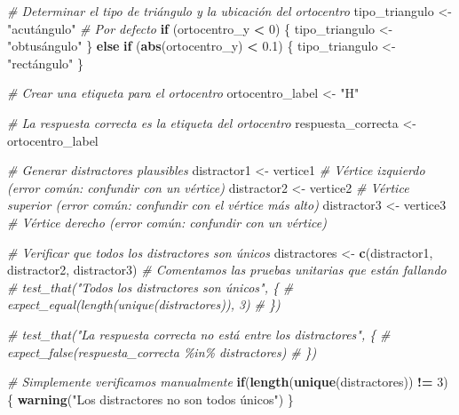 \documentclass[
]{article}
\newenvironment{Shaded}{\begin{snugshade}}{\end{snugshade}}
\newcommand{\CommentTok}[1]{\textcolor[rgb]{0.56,0.35,0.01}{\textit{#1}}}
\newcommand{\ControlFlowTok}[1]{\textcolor[rgb]{0.13,0.29,0.53}{\textbf{#1}}}
\newcommand{\DecValTok}[1]{\textcolor[rgb]{0.00,0.00,0.81}{#1}}
\newcommand{\FloatTok}[1]{\textcolor[rgb]{0.00,0.00,0.81}{#1}}
\newcommand{\FunctionTok}[1]{\textcolor[rgb]{0.13,0.29,0.53}{\textbf{#1}}}
\newcommand{\NormalTok}[1]{#1}
\newcommand{\OtherTok}[1]{\textcolor[rgb]{0.56,0.35,0.01}{#1}}
\newcommand{\SpecialCharTok}[1]{\textcolor[rgb]{0.81,0.36,0.00}{\textbf{#1}}}
\newcommand{\StringTok}[1]{\textcolor[rgb]{0.31,0.60,0.02}{#1}}
\begin{document}
\begin{Shaded}
\begin{Highlighting}[]
\CommentTok{\# Determinar el tipo de triángulo y la ubicación del ortocentro}
\NormalTok{tipo\_triangulo }\OtherTok{\textless{}{-}} \StringTok{"acutángulo"}  \CommentTok{\# Por defecto}
\ControlFlowTok{if}\NormalTok{ (ortocentro\_y }\SpecialCharTok{\textless{}} \DecValTok{0}\NormalTok{) \{}
\NormalTok{  tipo\_triangulo }\OtherTok{\textless{}{-}} \StringTok{"obtusángulo"}
\NormalTok{\} }\ControlFlowTok{else} \ControlFlowTok{if}\NormalTok{ (}\FunctionTok{abs}\NormalTok{(ortocentro\_y) }\SpecialCharTok{\textless{}} \FloatTok{0.1}\NormalTok{) \{}
\NormalTok{  tipo\_triangulo }\OtherTok{\textless{}{-}} \StringTok{"rectángulo"}
\NormalTok{\}}

\CommentTok{\# Crear una etiqueta para el ortocentro}
\NormalTok{ortocentro\_label }\OtherTok{\textless{}{-}} \StringTok{"H"}

\CommentTok{\# La respuesta correcta es la etiqueta del ortocentro}
\NormalTok{respuesta\_correcta }\OtherTok{\textless{}{-}}\NormalTok{ ortocentro\_label}

\CommentTok{\# Generar distractores plausibles}
\NormalTok{distractor1 }\OtherTok{\textless{}{-}}\NormalTok{ vertice1  }\CommentTok{\# Vértice izquierdo (error común: confundir con un vértice)}
\NormalTok{distractor2 }\OtherTok{\textless{}{-}}\NormalTok{ vertice2  }\CommentTok{\# Vértice superior (error común: confundir con el vértice más alto)}
\NormalTok{distractor3 }\OtherTok{\textless{}{-}}\NormalTok{ vertice3  }\CommentTok{\# Vértice derecho (error común: confundir con un vértice)}

\CommentTok{\# Verificar que todos los distractores son únicos}
\NormalTok{distractores }\OtherTok{\textless{}{-}} \FunctionTok{c}\NormalTok{(distractor1, distractor2, distractor3)}
\CommentTok{\# Comentamos las pruebas unitarias que están fallando}
\CommentTok{\# test\_that("Todos los distractores son únicos", \{}
\CommentTok{\#   expect\_equal(length(unique(distractores)), 3)}
\CommentTok{\# \})}

\CommentTok{\# test\_that("La respuesta correcta no está entre los distractores", \{}
\CommentTok{\#   expect\_false(respuesta\_correcta \%in\% distractores)}
\CommentTok{\# \})}

\CommentTok{\# Simplemente verificamos manualmente}
\ControlFlowTok{if}\NormalTok{(}\FunctionTok{length}\NormalTok{(}\FunctionTok{unique}\NormalTok{(distractores)) }\SpecialCharTok{!=} \DecValTok{3}\NormalTok{) \{}
  \FunctionTok{warning}\NormalTok{(}\StringTok{"Los distractores no son todos únicos"}\NormalTok{)}
\NormalTok{\}}


\end{Highlighting}
\end{Shaded}
\end{document}

